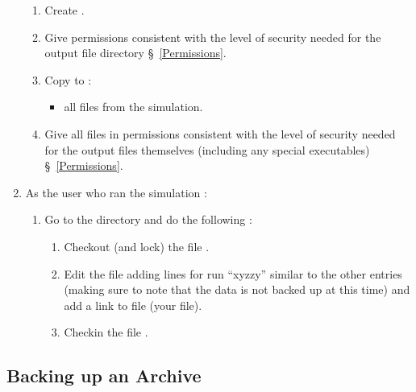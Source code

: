 \begin{enumerate}
\begin{enumerate}
      \item Create .
      \item Give  permissions consistent
            with the level of security needed for the output file directory
            \S~\ref{Permissions}.
      \item Copy to  :
            \begin{itemize}
            \item all  files from the simulation.
            \end{itemize}
      \item Give all files in  permissions
            consistent with the level of security needed for the output files
            themselves (including any special executables)
            \S~\ref{Permissions}.
      \end{enumerate}
\item As the user who ran the simulation :
      \begin{enumerate}
      \item Go to the directory  and do the following :
            \begin{enumerate}
            \item Checkout (and lock) the file .
            \item Edit the file  adding lines for run
                  ``xyzzy'' similar to the other entries (making sure to
                  note that the data is not backed up at this time) and
                  add a link to file  (your
                   file).
            \item Checkin the file .
            \end{enumerate}
      \end{enumerate}
\end{enumerate}


\subsection{Backing up an Archive}
\label{Backing up an Archive}

